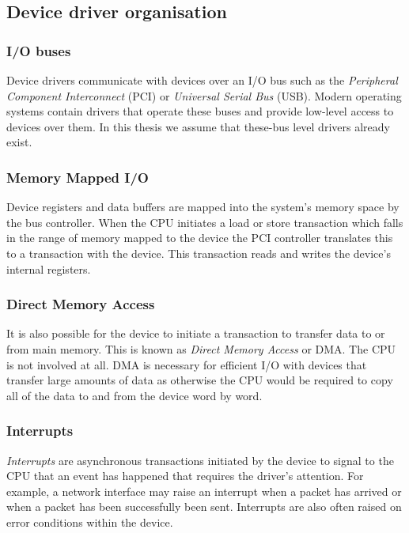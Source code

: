 \subsection{Device driver organisation}
\subsubsection{I/O buses}

Device drivers communicate with devices over an I/O bus such as the \emph{Peripheral Component Interconnect} (PCI) or \emph{Universal Serial Bus} (USB). Modern operating systems contain drivers that operate these buses and provide low-level access to devices over them. In this thesis we assume that these-bus level drivers already exist. 

\subsubsection{Memory Mapped I/O}

Device registers and data buffers are mapped into the system's memory space by the bus controller. When the CPU initiates a load or store transaction which falls in the range of memory mapped to the device the PCI controller translates this to a transaction with the device. This transaction reads and writes the device's internal registers.

\subsubsection{Direct Memory Access}

It is also possible for the device to initiate a transaction to transfer data to or from main memory. This is known as \emph{Direct Memory Access} or DMA. The CPU is not involved at all. DMA is necessary for efficient I/O with devices that transfer large amounts of data as otherwise the CPU would be required to copy all of the data to and from the device word by word.

\subsubsection{Interrupts}

\emph{Interrupts} are asynchronous transactions initiated by the device to signal to the CPU that an event has happened that requires the driver's attention. For example, a network interface may raise an interrupt when a packet has arrived or when a packet has been successfully been sent. Interrupts are also often raised on error conditions within the device.

